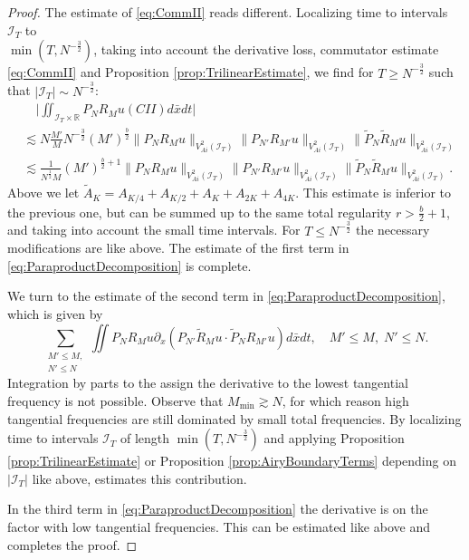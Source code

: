 \documentclass{amsart}
\theoremstyle{definition}
\newcommand{\R}{\mathbb{R}}
\begin{document}
\begin{proof}
The estimate of \eqref{eq:CommII} reads different. Localizing time to intervals $\mathcal{I}_T$ to \\ $\min(T, N^{-\frac{3}{2}})$, taking into account the derivative loss, commutator estimate \eqref{eq:CommII} and Proposition \ref{prop:TrilinearEstimate}, we find for $T \geq N^{-\frac{3}{2}}$ such that $|\mathcal{I}_T| \sim N^{-\frac{3}{2}}$:
\begin{equation*}
\begin{split}
&\quad \big| \iint_{\mathcal{I}_T \times \R} P_N R_M u (CII) d\bar{x} dt \big| \\
 &\lesssim N \frac{M'}{M} N^{-\frac{3}{2}} (M')^{\frac{b}{2}} \| P_N R_M u \|_{V^2_{Ai}(\mathcal{I}_T)} \| P_{N'} R_{M'} u \|_{V^2_{Ai}(\mathcal{I}_T)} \| \tilde{P}_N \tilde{R}_M u \|_{V^2_{Ai}(\mathcal{I}_T)} \\
&\lesssim \frac{1}{N^{\frac{1}{2}} M} (M')^{\frac{b}{2}+1} \| P_N R_M u \|_{V^2_{Ai}(\mathcal{I}_T)} \| P_{N'} R_{M'} u \|_{V^2_{Ai}(\mathcal{I}_T)} \| \tilde{P}_N \tilde{R}_M u \|_{V^2_{Ai}(\mathcal{I}_T)}.
\end{split}
\end{equation*}
Above we let $\tilde{A}_K = A_{K/4} + A_{K/2} + A_K + A_{2K} + A_{4K}$.
This estimate is inferior to the previous one, but can be summed up to the same total regularity $r > \frac{b}{2} + 1$, and taking into account the small time intervals. For $T \leq N^{-\frac{3}{2}}$ the necessary modifications are like above. The estimate of the first term in \eqref{eq:ParaproductDecomposition} is complete.

\smallskip

We turn to the estimate of the second term in \eqref{eq:ParaproductDecomposition}, which is given by 
\begin{equation*}
\sum_{\substack{M' \leq M, \\ N' \leq N}} \iint P_N R_M u \partial_x (P_{N'} \tilde{R}_M u \cdot \tilde{P}_N R_{M'} u) d\bar{x} dt, \quad M' \leq M, \; N' \leq N.
\end{equation*}
Integration by parts to the assign the derivative to the lowest tangential frequency is not possible. Observe that $M_{\min} \gtrsim N$, for which reason high tangential frequencies are still dominated by small total frequencies. By localizing time to intervals $\mathcal{I}_T$ of length $\min(T,N^{-\frac{3}{2}})$ and applying Proposition \ref{prop:TrilinearEstimate} or Proposition \ref{prop:AiryBoundaryTerms} depending on $|\mathcal{I}_T|$ like above, estimates this contribution.

In the third term in \eqref{eq:ParaproductDecomposition} the derivative is on the factor with low tangential frequencies. This can be estimated like above and completes the proof.
\end{proof}
\end{document}
